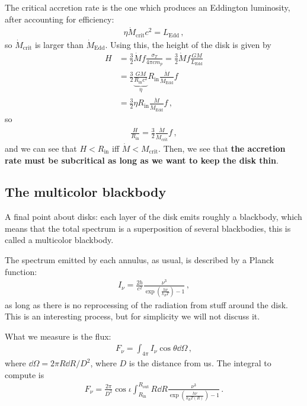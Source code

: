 \documentclass[main.tex]{subfiles}
\begin{document}
The critical accretion rate is the one which produces an Eddington luminosity, after accounting for efficiency: 
%
\begin{align}
\eta \dot{M} _{\text{crit}} c^2 = L _{\text{Edd}}
\,,
\end{align}
%
so \(\dot{M} _{\text{crit}}\) is larger than \(\dot{M} _{\text{Edd}}\). 
Using this, the height of the disk is given by 
%
\begin{align}
H &= \frac{3}{2} \dot{M} f \frac{\sigma _T}{4 \pi c m_p } = \frac{3}{2} \dot{M} f \frac{GM}{L _{\text{Edd}}} \\
&= \frac{3}{2} \underbrace{\frac{GM}{R _{\text{in}}c^2}}_{\eta } R _{\text{in}} \frac{\dot{M}}{\dot{M} _{\text{Edd}}} f  \\
&= \frac{3}{2} \eta R _{\text{in}} \frac{\dot{M}}{\dot{M} _{\text{Edd}}} f
\,,
\end{align}
%
so 
%
\begin{align}
\frac{H}{R _{\text{in}}} = \frac{3}{2} \frac{\dot{M}}{\dot{M} _{\text{crit}}} f
\,,
\end{align}
%
and we can see that \(H < R _{\text{in}}\) iff \(\dot{M} < M _{\text{crit}}\). 
Then, we see that \textbf{the accretion rate must be subcritical as long as we want to keep the disk thin}. 

\subsection{The multicolor blackbody}

A final point about disks: each layer of the disk emits roughly a blackbody, which means that the total spectrum is a superposition of several blackbodies, this is called a multicolor blackbody.

The spectrum emitted by each annulus, as usual, is described by a  Planck function: 
%
\begin{align}
I_\nu = \frac{2h}{c^2} \frac{\nu^3}{\exp(\frac{h \nu }{k_B T}) - 1}
\,,
\end{align}
%
as long as there is no reprocessing of the radiation from stuff around the disk.
This is an interesting process, but for simplicity we will not discuss it. 

What we measure is the flux: 
%
\begin{align}
F_\nu = \int_{4 \pi } I_\nu \cos \theta \dd{\Omega }
\,,
\end{align}
%
where \(\dd{\Omega } = 2 \pi R \dd{R}/D^2\), where \(D\) is the distance from us. 
The integral to compute is 
%
\begin{align}
F_\nu = \frac{2 \pi }{D^2} \cos \iota \int_{R _{\text{in}}}^{R _{\text{out}}} R \dd{R} \frac{\nu^3}{\exp(\frac{h \nu }{k_B T(R)}) - 1}
\,.
\end{align}
\end{document}
